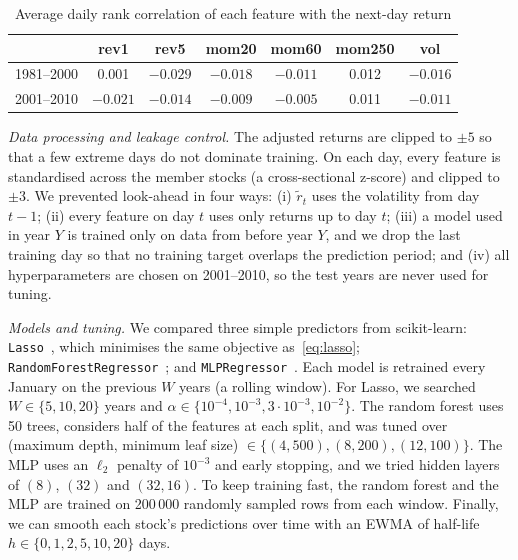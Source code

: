 \documentclass[conference]{IEEEtran}
\begin{document}
\begin{table}[t]
\centering
\caption{Average daily rank correlation of each feature with the next-day return}
\label{tab:ic}
\footnotesize\setlength{\tabcolsep}{3.5pt}
\begin{tabular}{lcccccc}
\toprule
 & rev1 & rev5 & mom20 & mom60 & mom250 & vol\\
\midrule
1981--2000 & 0.001 & $-0.029$ & $-0.018$ & $-0.011$ & 0.012 & $-0.016$\\
2001--2010 & $-0.021$ & $-0.014$ & $-0.009$ & $-0.005$ & 0.011 & $-0.011$\\
\bottomrule
\end{tabular}
\end{table}

\textit{Data processing and leakage control.} The adjusted returns are clipped to $\pm5$ so that a few extreme days do not dominate training. On each day, every feature is standardised across the member stocks (a cross-sectional z-score) and clipped to $\pm3$. We prevented look-ahead in four ways: (i) $\tilde r_t$ uses the volatility from day $t-1$; (ii) every feature on day $t$ uses only returns up to day $t$; (iii) a model used in year $Y$ is trained only on data from before year $Y$, and we drop the last training day so that no training target overlaps the prediction period; and (iv) all hyperparameters are chosen on 2001--2010, so the test years are never used for tuning.

\textit{Models and tuning.} We compared three simple predictors from scikit-learn: \texttt{Lasso}~\cite{skLasso}, which minimises the same objective as~\eqref{eq:lasso}; \texttt{RandomForestRegressor}~\cite{skRF}; and \texttt{MLPRegressor}~\cite{skMLP}. Each model is retrained every January on the previous $W$ years (a rolling window). For Lasso, we searched $W\in\{5,10,20\}$ years and $\alpha\in\{10^{-4},10^{-3},3\cdot10^{-3},10^{-2}\}$. The random forest uses 50 trees, considers half of the features at each split, and was tuned over (maximum depth, minimum leaf size) $\in\{(4,500),(8,200),(12,100)\}$. The MLP uses an $\ell_2$ penalty of $10^{-3}$ and early stopping, and we tried hidden layers of $(8)$, $(32)$ and $(32,16)$. To keep training fast, the random forest and the MLP are trained on 200\,000 randomly sampled rows from each window. Finally, we can smooth each stock's predictions over time with an EWMA of half-life $h\in\{0,1,2,5,10,20\}$ days.
\end{document}
